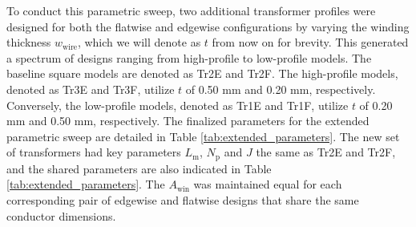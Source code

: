 To conduct this parametric sweep, two additional transformer profiles were designed for both the flatwise and edgewise configurations by varying the winding thickness $w_\mathrm{wire}$, which we will denote as $t$ from now on for brevity. This generated a spectrum of designs ranging from high-profile to low-profile models. The baseline square models are denoted as Tr2E and Tr2F. The high-profile models, denoted as Tr3E and Tr3F, utilize $t$ of 0.50 mm and 0.20 mm, respectively. Conversely, the low-profile models, denoted as Tr1E and Tr1F, utilize $t$ of 0.20 mm and 0.50 mm, respectively. The finalized parameters for the extended parametric sweep are detailed in Table \ref{tab:extended_parameters}. The new set of transformers had key parameters $L_{\mathrm{m}}$, $N_{\mathrm{p}}$ and $J$ the same as Tr2E and Tr2F, and the shared parameters are also indicated in Table \ref{tab:extended_parameters}. The $A_{\mathrm{win}}$ was maintained equal for each corresponding pair of edgewise and flatwise designs that share the same conductor dimensions.

\begin{table}[h]
\centering
\caption{Parameters of the Extended Transformer Aspect Ratio Models}
\label{tab:extended_parameters}
\end{table}

